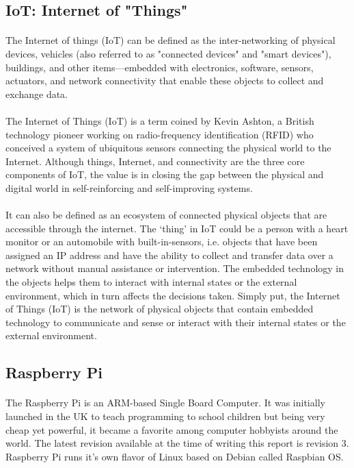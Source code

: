 \subsection{IoT: Internet of "Things"}
\paragraph{}
The Internet of things (IoT) can be defined as the inter-networking of physical devices, vehicles (also referred to as "connected devices" and "smart devices"), buildings, and other items—embedded with electronics, software, sensors, actuators, and network connectivity that enable these objects to collect and exchange data.
\paragraph{}
The Internet of Things (IoT) is a term coined by Kevin Ashton, a British technology pioneer working on radio-frequency identification (RFID) who conceived a system of ubiquitous sensors connecting the physical world to the Internet. Although things, Internet, and connectivity are the three core components of IoT, the value is in closing the gap between the physical and digital world in self-reinforcing and self-improving systems.
\paragraph{}
It can also be defined as an ecosystem of connected physical objects that are accessible through the internet. The ‘thing’ in IoT could be a person with a heart monitor or an automobile with built-in-sensors, i.e. objects that have been assigned an IP address and have the ability to collect and transfer data over a network without manual assistance or intervention. The embedded technology in the objects helps them to interact with internal states or the external environment, which in turn affects the decisions taken. Simply put, the Internet of Things (IoT) is the network of physical objects that contain embedded technology to communicate and sense or interact with their internal states or the external environment.

\subsection{Raspberry Pi}
\paragraph{}
The Raspberry Pi is an ARM-based Single Board Computer. It was initially launched in the UK to teach programming to school children but being very cheap yet powerful, it became a favorite among computer hobbyists around the world. The latest revision available at the time of writing this report is revision 3. Raspberry Pi runs it's own flavor of Linux based on Debian called Raspbian OS.
